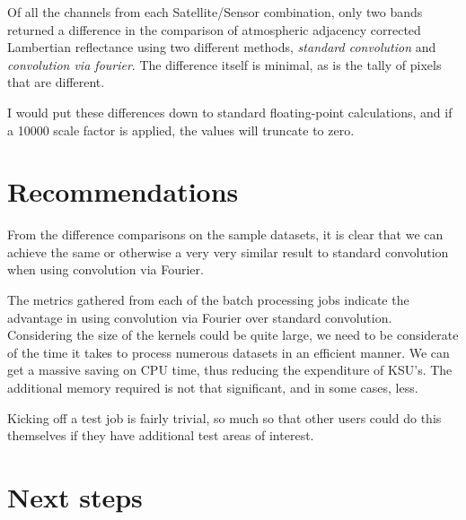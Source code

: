\documentclass[a4paper]{article}
\begin{document}
  \clearpage

    \begin{flushleft}
      Of all the channels from each Satellite/Sensor combination, only two bands returned a difference in the comparison of atmospheric adjacency corrected Lambertian reflectance using two different methods, \textit{standard convolution} and \textit{convolution via fourier}. The difference itself is minimal, as is the tally of pixels that are different. \par
      I would put these differences down to standard floating-point calculations, and if a 10000 scale factor is applied, the values will truncate to zero.
    \end{flushleft}

  \section{Recommendations}

    \begin{flushleft}
      From the difference comparisons on the sample datasets, it is clear that we can achieve the same or otherwise a very very similar result to standard convolution when using convolution via Fourier. \par
      The metrics gathered from each of the batch processing jobs indicate the advantage in using convolution via Fourier over standard convolution. Considering the size of the kernels could be quite large, we need to be considerate of the time it takes to process numerous datasets in an efficient manner. We can get a massive saving on CPU time, thus reducing the expenditure of KSU's. The additional memory required is not that significant, and in some cases, less. \par
      Kicking off a test job is fairly trivial, so much so that other users could do this themselves if they have additional test areas of interest.
    \end{flushleft}

  \section{Next steps}
\end{document}
